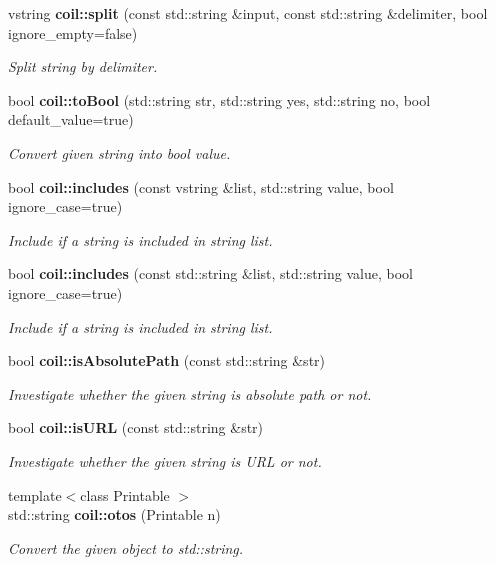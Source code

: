 \begin{DoxyCompactItemize}
vstring {\bf coil::split} (const std::string \&input, const std::string \&delimiter, bool ignore\_\-empty=false)
\begin{DoxyCompactList}\small\item\em Split string by delimiter. \item\end{DoxyCompactList}\item 
bool {\bf coil::toBool} (std::string str, std::string yes, std::string no, bool default\_\-value=true)
\begin{DoxyCompactList}\small\item\em Convert given string into bool value. \item\end{DoxyCompactList}\item 
bool {\bf coil::includes} (const vstring \&list, std::string value, bool ignore\_\-case=true)
\begin{DoxyCompactList}\small\item\em Include if a string is included in string list. \item\end{DoxyCompactList}\item 
bool {\bf coil::includes} (const std::string \&list, std::string value, bool ignore\_\-case=true)
\begin{DoxyCompactList}\small\item\em Include if a string is included in string list. \item\end{DoxyCompactList}\item 
bool {\bf coil::isAbsolutePath} (const std::string \&str)
\begin{DoxyCompactList}\small\item\em Investigate whether the given string is absolute path or not. \item\end{DoxyCompactList}\item 
bool {\bf coil::isURL} (const std::string \&str)
\begin{DoxyCompactList}\small\item\em Investigate whether the given string is URL or not. \item\end{DoxyCompactList}\item 
{\footnotesize template$<$class Printable $>$ }\\std::string {\bf coil::otos} (Printable n)
\begin{DoxyCompactList}\small\item\em Convert the given object to std::string. \item\end{DoxyCompactList}\item 

\end{DoxyCompactItemize}
